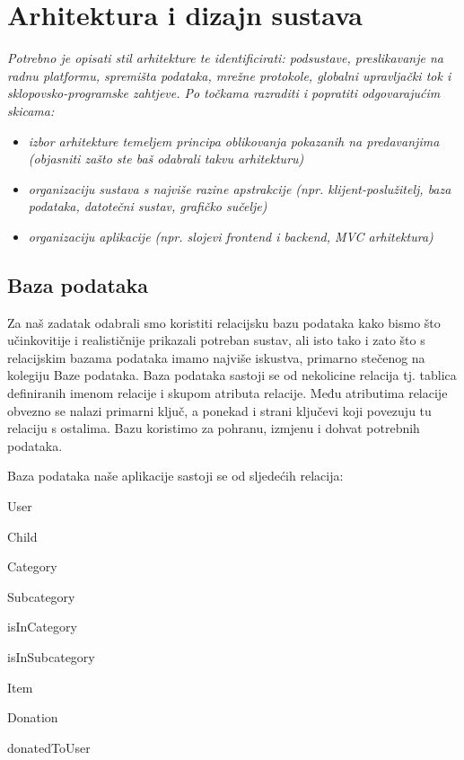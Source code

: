 \chapter{Arhitektura i dizajn sustava}
		

		\textit{ Potrebno je opisati stil arhitekture te identificirati: podsustave, preslikavanje na radnu platformu, spremišta podataka, mrežne protokole, globalni upravljački tok i sklopovsko-programske zahtjeve. Po točkama razraditi i popratiti odgovarajućim skicama:}
	\begin{itemize}
		\item 	\textit{izbor arhitekture temeljem principa oblikovanja pokazanih na predavanjima (objasniti zašto ste baš odabrali takvu arhitekturu)}
		\item 	\textit{organizaciju sustava s najviše razine apstrakcije (npr. klijent-poslužitelj, baza podataka, datotečni sustav, grafičko sučelje)}
		\item 	\textit{organizaciju aplikacije (npr. slojevi frontend i backend, MVC arhitektura) }		
	\end{itemize}
				
		\eject 

		\section{Baza podataka}
			
		Za naš zadatak odabrali smo koristiti relacijsku bazu podataka kako bismo što učinkovitije i realističnije prikazali potreban sustav, 
		ali isto tako i zato što s relacijskim bazama podataka imamo najviše iskustva, primarno stečenog na kolegiju Baze podataka.
		Baza podataka sastoji se od nekolicine relacija tj. tablica definiranih imenom relacije i skupom atributa relacije.
		Među atributima relacije obvezno se nalazi primarni ključ, a ponekad i strani ključevi koji povezuju tu relaciju s ostalima.
		Bazu koristimo za pohranu, izmjenu i dohvat potrebnih podataka.

		\vspace{5pt}

		Baza podataka naše aplikacije sastoji se od sljedećih relacija:
		\begin{packed_item}
			\item User
			\item Child
			\item Category
			\item Subcategory
			\item isInCategory
			\item isInSubcategory
			\item Item
			\item Donation
			\item donatedToUser
		\end{packed_item}
			
